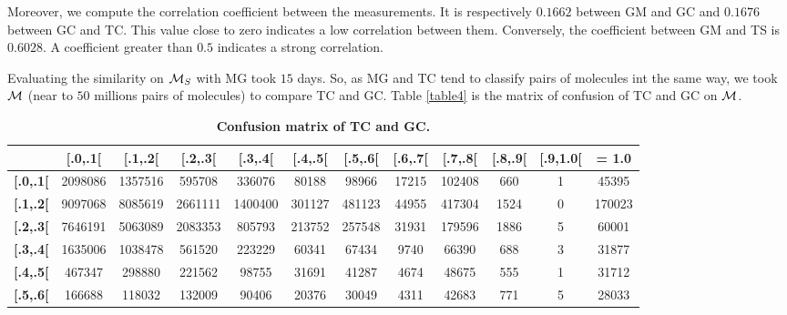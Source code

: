 \documentclass[10pt,letterpaper]{article}
\begin{document}
Moreover, we compute the correlation coefficient between the measurements. It is respectively $0.1662$ between GM and GC and $0.1676$ between GC and TC. This value close to zero indicates a low correlation between them. Conversely, the coefficient between GM and TS is $0.6028$. A coefficient  greater than $0.5$ indicates a strong correlation.


Evaluating the similarity on ${\cal M}_S$ with MG took $15$ days. So, as MG and TC tend to classify pairs of molecules int the same way, we took ${\cal M}$ (near to $50$ millions pairs of molecules) to compare TC and GC. Table \ref{table4} is the matrix of confusion of TC and GC on ${\cal M}$.

\begin{table}[!ht]
\begin{adjustwidth}{-1.25in}{0in} %
\centering
\caption{
{\bf Confusion matrix of TC and GC.}}

\begin{tabular}{|p{1cm}|c|c|c|c|c|c|c|c|c|c|c|}}

 \hline

\backslashbox[1.5cm]{\textbf{TC}}{\textbf{GC}} & \textbf{[.0,.1[} & \textbf{[.1,.2[} & \textbf{[.2,.3[} & \textbf{[.3,.4[} & \textbf{[.4,.5[} & \textbf{[.5,.6[} & \textbf{[.6,.7[} & \textbf{[.7,.8[} & \textbf{[.8,.9[} & \textbf{[.9,1.0[} &\textbf{ = 1.0}\\

\hline

\textbf{[.0,.1[} &2098086 &1357516 &595708 &336076 &80188 &98966 &17215 &102408 &660 &1 &45395 \\ \hline

\textbf{[.1,.2[} &9097068 &8085619 &2661111 &1400400 &301127 &481123 &44955 &417304 &1524 &0 &170023 \\ \hline

\textbf{[.2,.3[} &7646191 &5063089 &2083353 &805793 &213752 &257548 &31931 &179596 &1886 &5 &60001 \\ \hline

\textbf{[.3,.4[} &1635006 &1038478 &561520 &223229 &60341 &67434 &9740 &66390 &688 &3 &31877 \\ \hline

\textbf{[.4,.5[} &467347 &298880 &221562 &98755 &31691 &41287 &4674 &48675 &555 &1 &31712 \\ \hline

\textbf{[.5,.6[} &166688 &118032 &132009 &90406 &20376 &30049 &4311 &42683 &771 &5 &28033 \\ \hline


\end{tabular}
\end{adjustwidth}
\end{table}
\end{document}
